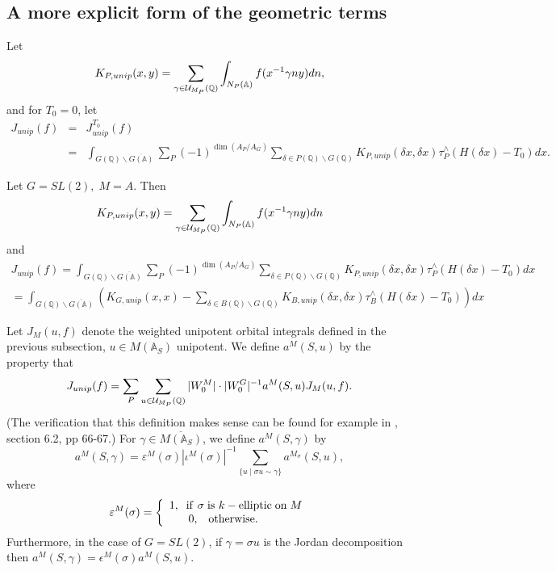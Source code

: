\subsection{A more explicit form of the geometric terms}

\begin{definition}
Let 
\[
K_{P,unip}(x,y)
=\sum_{\gamma \in {\cal U}_{M_P}{\mathbb {(Q)}}}
\int_{N_P({\mathbb {A})}}f(x^{-1}\gamma ny)dn,
\]
and for $T_0=0$, let 
\begin{eqnarray*}
J_{unip}(f)
&=&J_{unip}^{T_0}(f) \\
&=&\int_{G({\mathbb{Q}})\backslash \overline{G({\mathbb{A}})}}
\sum_P(-1)^{\dim(A_P/A_G)}
\sum_{\delta \in P({\mathbb {Q}})\backslash G({\mathbb{Q}})}
K_{P,unip}(\delta x,\delta x)
\tau _P^{\wedge }(H(\delta x)-T_0)dx.
\end{eqnarray*}
\end{definition}

\begin{example}
Let $G=SL(2),\;M=A$. Then 
\[
K_{P,unip}(x,y)
=\sum_{\gamma \in {\cal U}_{M_P}({\mathbb {Q}})}
\int_{N_P({\mathbb {A})}}f(x^{-1}\gamma ny)dn
\]
and 
\begin{eqnarray*}
J_{unip}(f)
=\int_{G({\mathbb {Q}})\backslash \overline{G({\mathbb{A}})}}
\sum_P(-1)^{\dim(A_P/A_G)}
\sum_{\delta \in P({\mathbb {Q}})\backslash G({\mathbb{Q}})}
K_{P,unip}(\delta x,\delta x)
\tau _P^{\wedge }(H(\delta x)-T_0)dx \\
=\int_{G({\mathbb{Q}})\backslash \overline{G({\mathbb{A}})}}
(K_{G,unip}(x,x)-
\sum_{\delta \in B({\mathbb {Q}})\backslash G({\mathbb{Q}})}
K_{B,unip}(\delta x,\delta x)
\tau _B^{\wedge }(H(\delta x)-T_0))dx
\end{eqnarray*}
\end{example}

\begin{definition}
Let $J_M(u,f)$ denote the weighted unipotent orbital integrals defined in
the previous subsection,
$u\in M({\mathbb A}_S)$ unipotent.
We define $a^M(S,u)$ by the property that 
\[
J_{unip}(f)
=\sum_P
\sum_{u\in {\cal U}_{M_P}({\mathbb {Q}})}
|W_0^M|\cdot |W_0^G|^{-1}a^M(S,u)J_M(u,f).
\]
(The verification that this definition makes sense can be found
for example in \cite{Sho}, section 6.2, pp 66-67.) For
$\gamma\in \overline{M({\mathbb A}_S)}$, we define $a^M(S,\gamma )$ by 
\[
a^M(S,\gamma )
=\varepsilon ^M(\sigma )|\iota ^M(\sigma)|^{-1}
\sum_{\{u\;|\;\sigma u\sim \gamma \}}a^{M_\sigma }(S,u),
\]
where 
\[
\varepsilon ^M(\sigma )=\left\{ 
\begin{array}{c}
1,\;\;{\rm if}\ \sigma \;{\rm is\ }k-{\rm elliptic\;on}\;M \\ 
0,\;\;\;{\rm otherwise}.\;\;\;\;\;\;\;\;
\end{array}
\right. 
\]
Furthermore, in the case of $G=SL(2)$, if $\gamma =\sigma u$
is the Jordan decomposition then
$a^M(S,\gamma)=\epsilon^M(\sigma)a^M(S,u)$.
\end{definition}

